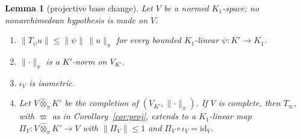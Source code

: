 \documentclass[11pt]{amsart}
\newtheorem{lemma}[theorem]{Lemma}
\theoremstyle{definition}
\theoremstyle{remark}
\numberwithin{equation}{section}
\newcommand{\id}{\mathrm{id}}
\newcommand{\norm}[1]{\lVert #1\rVert}
\begin{document}
\begin{lemma}[projective base change]\label{lem:bc}
Let $V$ be a normed $K_1$\nobreakdash-space; no nonarchimedean hypothesis is made on $V$.
\begin{enumerate}
\item $\norm{T_\psi u}\le\norm\psi\,\norm u_\pi$ for every bounded $K_1$\nobreakdash-linear $\psi\colon K'\to K_1$.
\item $\norm\cdot_\pi$ is a $K'$\nobreakdash-norm on $V_{K'}$.
\item $\iota_V$ is isometric.
\item Let $V\widehat\otimes_\pi K'$ be the completion of $(V_{K'},\norm\cdot_\pi)$. If $V$ is complete, then $T_\varpi$, with
$\varpi$ as in Corollary~\ref{cor:proj}, extends to a $K_1$\nobreakdash-linear map $\Pi_V\colon V\widehat\otimes_\pi K'\to V$ with
$\norm{\Pi_V}\le1$ and $\Pi_V\circ\iota_V=\id_V$.
\end{enumerate}
\end{lemma}
\end{document}
